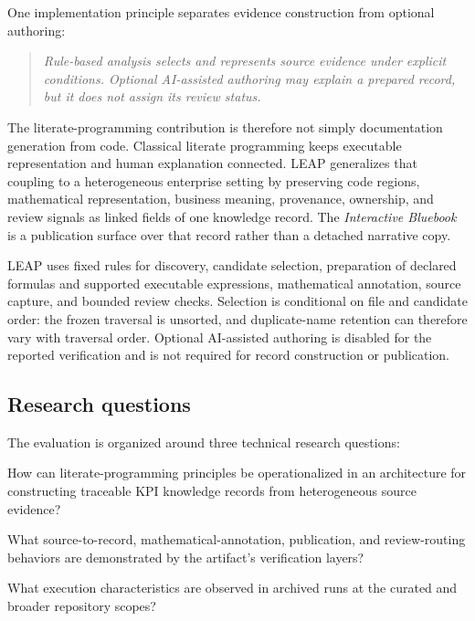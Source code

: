 \documentclass[a4paper,fleqn]{cas-dc}
\newcommand{\tool}{\textsc{LEAP}}
\newcommand{\bluebook}{\emph{Interactive Bluebook}}
\begin{document}
One implementation principle separates evidence construction from optional authoring:

\begin{quote}
\emph{Rule-based analysis selects and represents source evidence under explicit conditions. Optional AI-assisted authoring may explain a prepared record, but it does not assign its review status.}
\end{quote}

The literate-programming contribution is therefore not simply documentation generation from code. Classical literate programming keeps executable representation and human explanation connected. \tool{} generalizes that coupling to a heterogeneous enterprise setting by preserving code regions, mathematical representation, business meaning, provenance, ownership, and review signals as linked fields of one knowledge record. The \bluebook{} is a publication surface over that record rather than a detached narrative copy.

\tool{} uses fixed rules for discovery, candidate selection, preparation of declared formulas and supported executable expressions, mathematical annotation, source capture, and bounded review checks. Selection is conditional on file and candidate order: the frozen traversal is unsorted, and duplicate-name retention can therefore vary with traversal order. Optional AI-assisted authoring is disabled for the reported verification and is not required for record construction or publication.

\subsection{Research questions}

The evaluation is organized around three technical research questions:

\begin{description}[style=nextline,leftmargin=1.2cm]
  \item[\textbf{RQ1}] How can literate-programming principles be operationalized in an architecture for constructing traceable KPI knowledge records from heterogeneous source evidence?
  \item[\textbf{RQ2}] What source-to-record, mathematical-annotation, publication, and review-routing behaviors are demonstrated by the artifact's verification layers?
  \item[\textbf{RQ3}] What execution characteristics are observed in archived runs at the curated and broader repository scopes?

\end{description}
\end{document}
